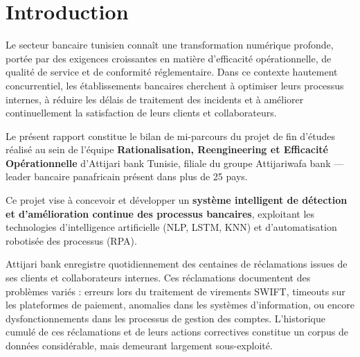 \documentclass[12pt,a4paper]{report}
\begin{document}
\tableofcontents
\thispagestyle{empty}
\newpage

\chapter{Introduction}

Le secteur bancaire tunisien connaît une transformation numérique profonde, portée par des exigences croissantes en matière d'efficacité opérationnelle, de qualité de service et de conformité réglementaire. Dans ce contexte hautement concurrentiel, les établissements bancaires cherchent à optimiser leurs processus internes, à réduire les délais de traitement des incidents et à améliorer continuellement la satisfaction de leurs clients et collaborateurs.

Le présent rapport constitue le bilan de mi-parcours du projet de fin d'études réalisé au sein de l'équipe \textbf{Rationalisation, Reengineering et Efficacité Opérationnelle} d'Attijari bank Tunisie, filiale du groupe Attijariwafa bank --- leader bancaire panafricain présent dans plus de 25 pays.

Ce projet vise à concevoir et développer un \textbf{système intelligent de détection et d'amélioration continue des processus bancaires}, exploitant les technologies d'intelligence artificielle (NLP, LSTM, KNN) et d'automatisation robotisée des processus (RPA).

Attijari bank enregistre quotidiennement des centaines de réclamations issues de ses clients et collaborateurs internes. Ces réclamations documentent des problèmes variés : erreurs lors du traitement de virements SWIFT, timeouts sur les plateformes de paiement, anomalies dans les systèmes d'information, ou encore dysfonctionnements dans les processus de gestion des comptes. L'historique cumulé de ces réclamations et de leurs actions correctives constitue un corpus de données considérable, mais demeurant largement sous-exploité.

\vspace{0.5cm}
\noindent{}
\vspace{0.5cm}
\end{document}
